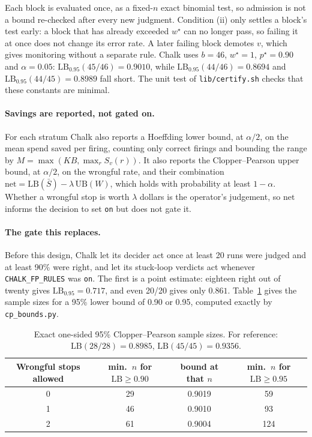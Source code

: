 \documentclass[11pt]{article}
\theoremstyle{remark}
\newcommand{\LB}{\mathrm{LB}}
\newcommand{\UB}{\mathrm{UB}}
\begin{document}
Each block is evaluated once, as a fixed-$n$ exact binomial test, so admission is not a bound re-checked after every new judgment. Condition (ii) only settles a block's test early: a block that has already exceeded $w^\star$ can no longer pass, so failing it at once does not change its error rate. A later failing block demotes $v$, which gives monitoring without a separate rule. Chalk uses $b=46$, $w^\star=1$, $p^\star=0.90$ and $\alpha=0.05$: $\LB_{0.95}(45/46)=0.9010$, while $\LB_{0.95}(44/46)=0.8694$ and $\LB_{0.95}(44/45)=0.8989$ fall short. The unit test of \texttt{lib/\allowbreak certify.sh} checks that these constants are minimal.

\paragraph{Savings are reported, not gated on.}
For each stratum Chalk also reports a Hoeffding lower bound, at $\alpha/2$, on the mean spend saved per firing, counting only correct firings and bounding the range by $M=\max(K B, \max_r S_v(r))$. It also reports the Clopper--Pearson upper bound, at $\alpha/2$, on the wrongful rate, and their combination $\mathrm{net}=\LB(\bar S)-\lambda\,\UB(W)$, which holds with probability at least $1-\alpha$. Whether a wrongful stop is worth $\lambda$ dollars is the operator's judgement, so $\mathrm{net}$ informs the decision to set \texttt{on} but does not gate it.

\paragraph{The gate this replaces.}
Before this design, Chalk let its decider act once at least 20 runs were judged and at least 90\% were right, and let its stuck-loop verdicts act whenever \texttt{CHALK\_FP\_RULES} was \texttt{on}. The first is a point estimate: eighteen right out of twenty gives $\LB_{0.95}=0.717$, and even 20/20 gives only $0.861$. Table~\ref{tab:cp} gives the sample sizes for a 95\% lower bound of 0.90 or 0.95, computed exactly by \texttt{cp\_bounds.py}.

\begin{table}[t]
\centering\small
\begin{tabular}{@{}cccc@{}}
\toprule
Wrongful stops allowed & min.\ $n$ for $\LB\ge 0.90$ & bound at that $n$ & min.\ $n$ for $\LB\ge 0.95$ \\
\midrule
0 & 29 & 0.9019 & 59 \\
1 & 46 & 0.9010 & 93 \\
2 & 61 & 0.9004 & 124 \\
\bottomrule
\end{tabular}
\caption{Exact one-sided 95\% Clopper--Pearson sample sizes. For reference: $\LB(28/28)=0.8985$, $\LB(45/45)=0.9356$.}
\label{tab:cp}
\end{table}
\end{document}
